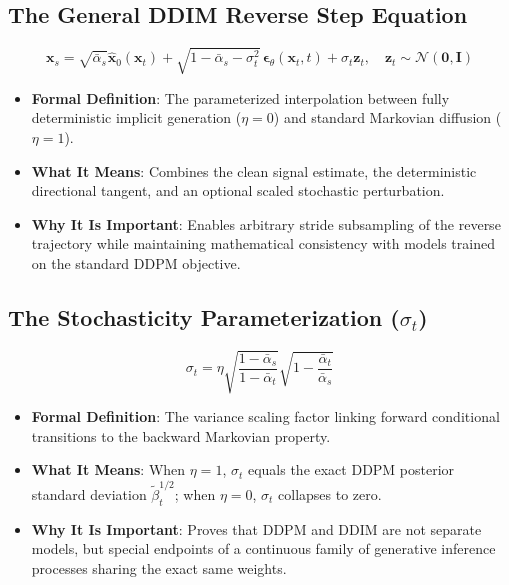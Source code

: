 \documentclass[11pt,a4paper]{article}
\theoremstyle{definition}
\begin{document}
\subsection{The General DDIM Reverse Step Equation}
{\boldmath
\begin{equation}
\mathbf{x}_s = \sqrt{\bar{\alpha}_s} \hat{\mathbf{x}}_0(\mathbf{x}_t) + \sqrt{1 - \bar{\alpha}_s - \sigma_t^2} \, \boldsymbol{\epsilon}_\theta(\mathbf{x}_t, t) + \sigma_t \mathbf{z}_t, \quad \mathbf{z}_t \sim \mathcal{N}(\mathbf{0}, \mathbf{I})
\end{equation}
}
\begin{itemize}
    \item \textbf{Formal Definition}: The parameterized interpolation between fully deterministic implicit generation ($\eta = 0$) and standard Markovian diffusion ($\eta = 1$).
    \item \textbf{What It Means}: Combines the clean signal estimate, the deterministic directional tangent, and an optional scaled stochastic perturbation.
    \item \textbf{Why It Is Important}: Enables arbitrary stride subsampling of the reverse trajectory while maintaining mathematical consistency with models trained on the standard DDPM objective.
\end{itemize}

\subsection{The Stochasticity Parameterization ($\sigma_t$)}
{\boldmath
\begin{equation}
\sigma_t = \eta \sqrt{\frac{1 - \bar{\alpha}_s}{1 - \bar{\alpha}_t}} \sqrt{1 - \frac{\bar{\alpha}_t}{\bar{\alpha}_s}}
\end{equation}
}
\begin{itemize}
    \item \textbf{Formal Definition}: The variance scaling factor linking forward conditional transitions to the backward Markovian property.
    \item \textbf{What It Means}: When $\eta = 1$, $\sigma_t$ equals the exact DDPM posterior standard deviation $\tilde{\beta}_t^{1/2}$; when $\eta = 0$, $\sigma_t$ collapses to zero.
    \item \textbf{Why It Is Important}: Proves that DDPM and DDIM are not separate models, but special endpoints of a continuous family of generative inference processes sharing the exact same weights.
\end{itemize}
\end{document}
